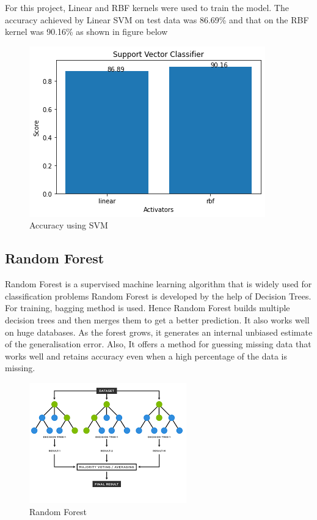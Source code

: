 \documentclass{article}
\begin{document}
For this project, Linear and RBF kernels were used to train the model. The accuracy achieved by Linear SVM on test data was 86.69\% and that on the RBF kernel was 90.16\% as shown in figure below

\begin{figure}[h]
    \centering
    \includegraphics[scale=0.50]{svmscu.png}
    \caption{Accuracy using SVM}
\end{figure}


\subsection{Random Forest}
Random Forest is a supervised machine learning algorithm that is widely used for classification problems Random Forest is developed by the help of Decision Trees. For training, bagging method is used. Hence Random Forest builds multiple decision trees and then merges them to get a better prediction. It also works well on huge databases. As the forest grows, it generates an internal unbiased estimate of the generalisation error. Also, It offers a method for guessing missing data that works well and retains accuracy even when a high percentage of the data is missing.

\begin{figure}[h]
    \centering
    \includegraphics[scale=1]{renfor.png}
    \caption{Random Forest}
\end{figure}
\end{document}
